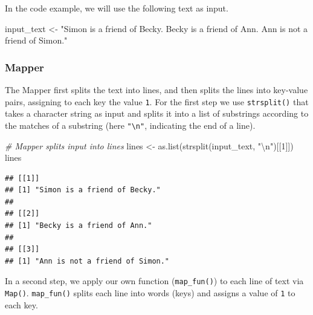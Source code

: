 \documentclass[
  12pt,
]{style/krantz}
\newenvironment{Shaded}{\begin{snugshade}}{\end{snugshade}}
\newcommand{\CommentTok}[1]{\textcolor[rgb]{0.56,0.35,0.01}{\textit{#1}}}
\newcommand{\DecValTok}[1]{\textcolor[rgb]{0.00,0.00,0.81}{#1}}
\newcommand{\FunctionTok}[1]{\textcolor[rgb]{0.00,0.00,0.00}{#1}}
\newcommand{\NormalTok}[1]{#1}
\newcommand{\OtherTok}[1]{\textcolor[rgb]{0.56,0.35,0.01}{#1}}
\newcommand{\SpecialCharTok}[1]{\textcolor[rgb]{0.00,0.00,0.00}{#1}}
\newcommand{\StringTok}[1]{\textcolor[rgb]{0.31,0.60,0.02}{#1}}
\begin{document}
In the code example, we will use the following text as input.

\begin{Shaded}
\begin{Highlighting}[]
\NormalTok{input\_text }\OtherTok{\textless{}{-}}
\StringTok{"Simon is a friend of Becky.}
\StringTok{Becky is a friend of Ann.}
\StringTok{Ann is not a friend of Simon."}
\end{Highlighting}
\end{Shaded}

\hypertarget{mapper}{%
\subsubsection{Mapper}\label{mapper}}

The Mapper first splits the text into lines, and then splits the lines into key-value pairs, assigning to each key the value \texttt{1}. For the first step we use \texttt{strsplit()} that takes a character string as input and splits it into a list of substrings according to the matches of a substring (here \texttt{"\textbackslash{}n"}, indicating the end of a line).

\begin{Shaded}
\begin{Highlighting}[]
\CommentTok{\# Mapper splits input into lines}
\NormalTok{lines }\OtherTok{\textless{}{-}} \FunctionTok{as.list}\NormalTok{(}\FunctionTok{strsplit}\NormalTok{(input\_text, }\StringTok{"}\SpecialCharTok{\textbackslash{}n}\StringTok{"}\NormalTok{)[[}\DecValTok{1}\NormalTok{]])}
\NormalTok{lines}
\end{Highlighting}
\end{Shaded}

\begin{verbatim}
## [[1]]
## [1] "Simon is a friend of Becky."
## 
## [[2]]
## [1] "Becky is a friend of Ann."
## 
## [[3]]
## [1] "Ann is not a friend of Simon."
\end{verbatim}

In a second step, we apply our own function (\texttt{map\_fun()}) to each line of text via \texttt{Map()}. \texttt{map\_fun()} splits each line into words (keys) and assigns a value of \texttt{1} to each key.
\end{document}

